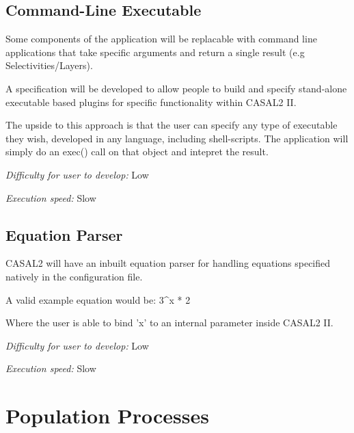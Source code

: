 \documentclass[a4paper,11pt,twoside,pdftex,draft]{article}
\begin{document}
\hypertarget{command-line-executable}{%
\subsection[Command-Line
Executable]{\texorpdfstring{\protect\hypertarget{anchor-34}{}{}Command-Line
Executable}{Command-Line Executable}}\label{command-line-executable}}

Some components of the application will be replacable with command line
applications that take specific arguments and return a single result
(e.g Selectivities/Layers).

A specification will be developed to allow people to build and specify
stand-alone executable based plugins for specific functionality within
CASAL2 II.

The upside to this approach is that the user can specify any type of
executable they wish, developed in any language, including
shell-scripts. The application will simply do an exec() call on that
object and intepret the result.

\emph{Difficulty for user to develop:} Low

\emph{Execution speed:} Slow

\hypertarget{equation-parser}{%
\subsection[Equation
Parser]{\texorpdfstring{\protect\hypertarget{anchor-35}{}{}Equation
Parser}{Equation Parser}}\label{equation-parser}}

CASAL2 will have an inbuilt equation parser for handling equations
specified natively in the configuration file.

A valid example equation would be: 3\^{}x * 2

Where the user is able to bind 'x' to an internal parameter inside
CASAL2 II.

\emph{Difficulty for user to develop:} Low

\emph{Execution speed:} Slow

\hypertarget{section-6}{%
\section{}\label{section-6}}

\hypertarget{population-processes}{%
\section[Population
Processes]{\texorpdfstring{\protect\hypertarget{anchor-36}{}{}Population
Processes}{Population Processes}}\label{population-processes}}
\end{document}
